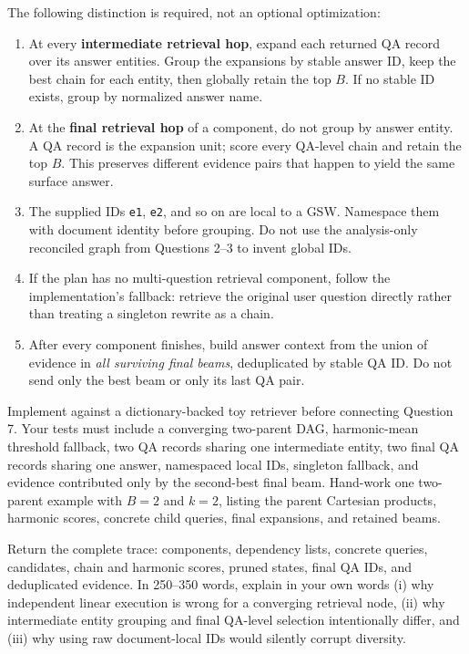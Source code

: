 \documentclass[11pt]{article}
\newcommand{\code}[1]{\texttt{#1}}
\begin{document}
The following distinction is required, not an optional optimization:
\begin{enumerate}[label=(\arabic*)]
  \item At every \textbf{intermediate retrieval hop}, expand each returned QA
        record over its answer entities. Group the expansions by stable answer
        ID, keep the best chain for each entity, then globally retain the top
        $B$. If no stable ID exists, group by normalized answer name.
  \item At the \textbf{final retrieval hop} of a component, do not group by
        answer entity. A QA record is the expansion unit; score every QA-level
        chain and retain the top $B$. This preserves different evidence pairs
        that happen to yield the same surface answer.
  \item The supplied IDs \code{e1}, \code{e2}, and so on are local to a GSW.
        Namespace them with document identity before grouping. Do not use the
        analysis-only reconciled graph from Questions 2--3 to invent global
        IDs.
  \item If the plan has no multi-question retrieval component, follow the
        implementation's fallback: retrieve the original user question
        directly rather than treating a singleton rewrite as a chain.
  \item After every component finishes, build answer context from the union
        of evidence in \emph{all surviving final beams}, deduplicated by stable
        QA ID. Do not send only the best beam or only its last QA pair.
\end{enumerate}

Implement against a dictionary-backed toy retriever before connecting
Question 7. Your tests must include a converging two-parent DAG, harmonic-mean
threshold fallback, two QA records sharing one intermediate entity, two final
QA records sharing one answer, namespaced local IDs, singleton fallback, and
evidence contributed only by the second-best final beam. Hand-work one
two-parent example with $B=2$ and $k=2$, listing the parent Cartesian products,
harmonic scores, concrete child queries, final expansions, and retained beams.

Return the complete trace: components, dependency lists, concrete queries,
candidates, chain and harmonic scores, pruned states, final QA IDs, and
deduplicated evidence. In 250--350 words, explain in your own words (i) why
independent linear execution is wrong for a converging retrieval node, (ii)
why intermediate entity grouping and final QA-level selection intentionally
differ, and (iii) why using raw document-local IDs would silently corrupt
diversity.
\end{document}
